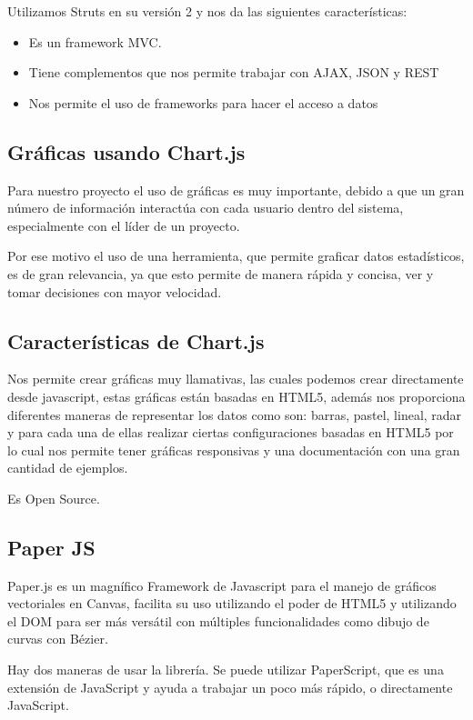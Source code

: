 Utilizamos Struts en su versión 2 y nos da las siguientes características: 

\begin{itemize}
\item Es un framework MVC. 
\item Tiene complementos que nos permite trabajar con AJAX, JSON y REST 
\item Nos permite el uso de frameworks para hacer el acceso a datos
\end{itemize}
\subsection{Gráficas usando Chart.js }  
Para nuestro proyecto el uso de gráficas es muy importante, debido a que un gran número de información interactúa con cada usuario dentro del sistema, especialmente con el líder de un proyecto. 

Por ese motivo el uso de una herramienta, que permite graficar datos estadísticos, es de gran relevancia, ya que esto permite de manera rápida y concisa, ver y tomar decisiones con mayor velocidad. 
\subsection{Características de Chart.js }  
Nos permite crear gráficas muy llamativas, las cuales podemos crear directamente desde javascript, estas gráficas están basadas en HTML5, además nos proporciona diferentes maneras de representar los datos como son: barras, pastel, lineal, radar y para cada una de ellas realizar ciertas configuraciones basadas en HTML5 por lo cual nos permite tener gráficas responsivas y una documentación con una gran cantidad de ejemplos. 

Es Open Source. 
\subsection{Paper JS }  

Paper.js es un magnífico Framework de Javascript para el manejo de gráficos vectoriales en Canvas, facilita su uso utilizando el poder de HTML5 y utilizando el DOM para ser más versátil con múltiples funcionalidades como dibujo de curvas con Bézier. 

Hay dos maneras de usar la librería. Se puede utilizar PaperScript, que es una extensión de JavaScript y ayuda a trabajar un poco más rápido, o directamente JavaScript. \cite{EmpezandoConPaper}

